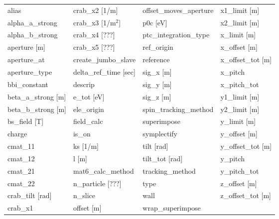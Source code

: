  \begin{tabular}{llll} \toprule
alias                            & crab_x2 [1/m]                    & offset_moves_aperture            & x1_limit [m]                     \\
alpha_a_strong                   & crab_x3 [1/m$^2$]                & p0c [eV]                         & x2_limit [m]                     \\
alpha_b_strong                   & crab_x4 [???]                    & ptc_integration_type             & x_limit [m]                      \\
aperture [m]                     & crab_x5 [???]                    & ref_origin                       & x_offset [m]                     \\
aperture_at                      & create_jumbo_slave               & reference                        & x_offset_tot [m]                 \\
aperture_type                    & delta_ref_time [sec]             & sig_x [m]                        & x_pitch                          \\
bbi_constant                     & descrip                          & sig_y [m]                        & x_pitch_tot                      \\
beta_a_strong [m]                & e_tot [eV]                       & sig_z [m]                        & y1_limit [m]                     \\
beta_b_strong [m]                & ele_origin                       & spin_tracking_method             & y2_limit [m]                     \\
bs_field [T]                     & field_calc                       & superimpose                      & y_limit [m]                      \\
charge                           & is_on                            & symplectify                      & y_offset [m]                     \\
cmat_11                          & ks [1/m]                         & tilt [rad]                       & y_offset_tot [m]                 \\
cmat_12                          & l [m]                            & tilt_tot [rad]                   & y_pitch                          \\
cmat_21                          & mat6_calc_method                 & tracking_method                  & y_pitch_tot                      \\
cmat_22                          & n_particle [???]                 & type                             & z_offset [m]                     \\
crab_tilt [rad]                  & n_slice                          & wall                             & z_offset_tot [m]                 \\
crab_x1                          & offset [m]                       & wrap_superimpose                 &                                  \\
 \bottomrule
 \end{tabular}
 \vfill
 
